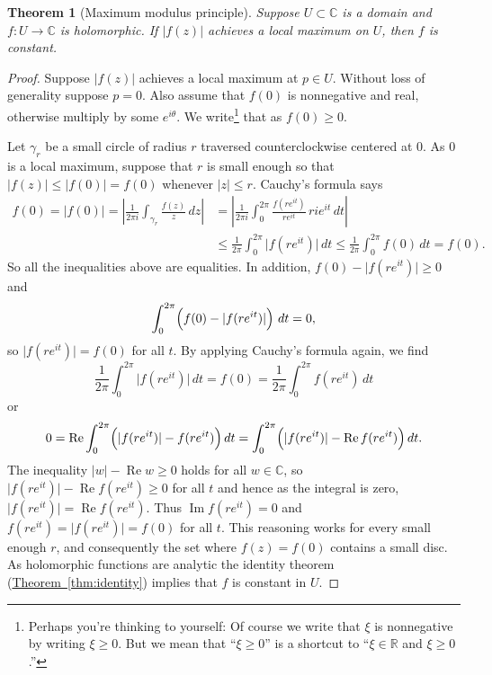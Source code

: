 \documentclass[12pt,openany]{book}
\renewcommand{\Re}{\operatorname{Re}}
\renewcommand{\Im}{\operatorname{Im}}
\newcommand{\sabs}[1]{\lvert {#1} \rvert}
\newcommand{\abs}[1]{\left\lvert {#1} \right\rvert}
\newcommand{\C}{{\mathbb{C}}}
\newcommand{\R}{{\mathbb{R}}}
\newcommand{\myquote}[1]{``#1''}
\theoremstyle{plain}
\newtheorem{thm}{Theorem}[section]
\theoremstyle{remark}
\theoremstyle{definition}
\theoremstyle{exercise}
\theoremstyle{example}
\newcommand{\thmref}[1]{\hyperref[#1]{Theorem~\ref*{#1}}}
\begin{document}
\begin{thm}[Maximum modulus principle]
%
%
Suppose $U \subset \C$ is a domain and
$f \colon U \to \C$ is holomorphic.
If $\sabs{f(z)}$ achieves a local maximum on $U$, then $f$ is constant.
\end{thm}

\begin{proof}
Suppose $\sabs{f(z)}$ achieves a local maximum at $p \in U$.
Without loss of generality suppose $p = 0$.
Also assume that $f(0)$ is nonnegative and real, otherwise multiply by 
some $e^{i\theta}$.
We write\footnote{%
Perhaps you're thinking to yourself: Of course we write that $\xi$ is
nonnegative by writing $\xi \geq 0$.
But we mean that \myquote{$\xi \geq 0$}
is a shortcut to \myquote{$\xi \in \R$ and $\xi \geq 0$.}}
that as $f(0) \geq 0$.

Let $\gamma_r$ be a small circle of radius $r$ traversed counterclockwise
centered at $0$.  As $0$ is a local maximum, suppose that $r$ is small enough
so that
$\sabs{f(z)} \leq \sabs{f(0)} = f(0)$ whenever $\sabs{z} \leq r$.
Cauchy's formula says
\begin{equation*}
\begin{split}
f(0) = \sabs{f(0)} =
\abs{\frac{1}{2\pi i}
\int_{\gamma_r}
\frac{f(z)}{z} \, dz
}
& =
\abs{
\frac{1}{2\pi i}
\int_0^{2\pi}
\frac{f(re^{it})}{re^{it}} \, ri e^{it} \, dt
}
\\
& \leq
\frac{1}{2\pi}
\int_0^{2\pi}
\sabs{f(re^{it})}\, dt
\leq
\frac{1}{2\pi}
\int_0^{2\pi}
f(0)\, dt = f(0) .
\end{split}
\end{equation*}
So all the inequalities above are equalities.
In addition, $f(0)-\sabs{f(re^{it})} \geq 0$ and
\begin{equation*}
\int_0^{2\pi}\Bigl( f(0)-\sabs{f(re^{it})} \Bigr) \ dt = 0 ,
\end{equation*}
so $\sabs{f(re^{it})} = f(0)$ for all $t$.
By applying Cauchy's formula
again, we find
\begin{equation*}
\frac{1}{2\pi}
\int_0^{2\pi}
\sabs{f(re^{it})}\, dt
=
f(0)
=
\frac{1}{2\pi}
\int_0^{2\pi}
f(re^{it})\, dt
\end{equation*}
or
\begin{equation*}
0 =
\Re \int_0^{2\pi}
\Bigl(\sabs{f(re^{it})}-f(re^{it})\Bigr)\, dt
=
\int_0^{2\pi}
\Bigl(\sabs{f(re^{it})}-\Re f(re^{it})\Bigr)\, dt .
\end{equation*}
The inequality $\sabs{w} - \Re w \geq 0$ holds for all $w \in \C$,
so
$\sabs{f(re^{it})}-\Re f(re^{it}) \geq 0$ for all $t$ and hence
as the integral is zero,
$\sabs{f(re^{it})}=\Re f(re^{it})$.  Thus $\Im f(re^{it}) = 0$
and 
$f(re^{it})=\sabs{f(re^{it})} = f(0)$ for all $t$.
This reasoning works for every small enough $r$, and consequently the set where
$f(z) = f(0)$ contains a small disc.  As holomorphic functions are analytic
the identity theorem (\thmref{thm:identity}) implies that $f$ is constant in
$U$.
\end{proof}
\end{document}
